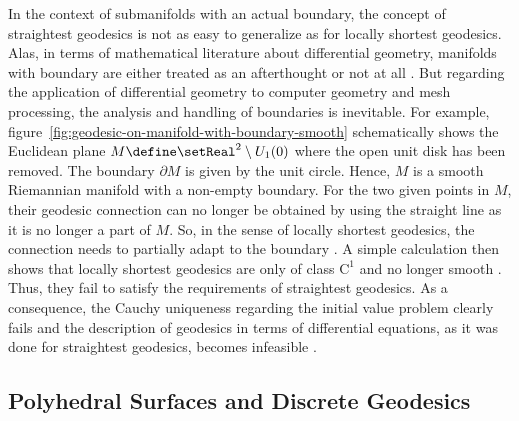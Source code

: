 \documentclass{stdlocal}
\begin{document}
  In the context of submanifolds with an actual boundary, the concept of straightest geodesics is not as easy to generalize as for locally shortest geodesics.
  Alas, in terms of mathematical literature about differential geometry, manifolds with boundary are either treated as an afterthought or not at all \autocite{goldhorn2009,carmo2016,kuehnel2013}.
  But regarding the application of differential geometry to computer geometry and mesh processing, the analysis and handling of boundaries is inevitable.
  For example, figure~\ref{fig:geodesic-on-manifold-with-boundary-smooth} schematically shows the Euclidean plane $M\define \setReal^2\setminus U_1(0)$ where the open unit disk has been removed.
  The boundary $\partial M$ is given by the unit circle.
  Hence, $M$ is a smooth Riemannian manifold with a non-empty boundary.
  For the two given points in $M$, their geodesic connection can no longer be obtained by using the straight line as it is no longer a part of $M$.
  So, in the sense of locally shortest geodesics, the connection needs to partially adapt to the boundary \autocite{albrecht1991}.
  A simple calculation then shows that locally shortest geodesics are only of class $\mathrm{C}^1$ and no longer smooth \autocite{alexander1981}.
  Thus, they fail to satisfy the requirements of straightest geodesics.
  As a consequence, the Cauchy uniqueness regarding the initial value problem clearly fails and the description of geodesics in terms of differential equations, as it was done for straightest geodesics, becomes infeasible \autocite{alexander1986,alexander1987}.





\subsection{Polyhedral Surfaces and Discrete Geodesics} %
\label{sub:polyhedral_surfaces}
\end{document}
